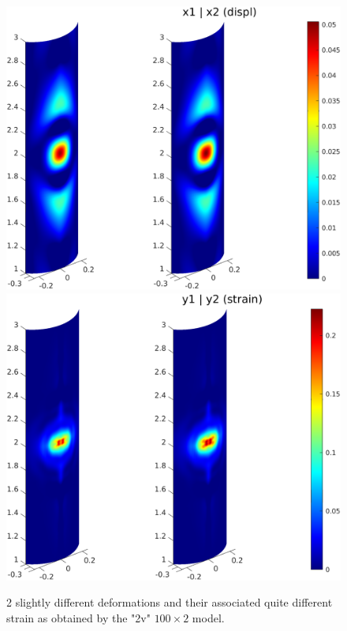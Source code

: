	\begin{figure}[t!]
\includegraphics[scale=0.5]{deform.png} \hspace{0.8cm}
\includegraphics[scale=0.5]{strain.png}
\caption{2 slightly different deformations and their associated quite different strain as obtained by the "2v" $100 \times 2$ model.}
\label{fig5}
\end{figure}	


	
	\vspace*{1ex}
	

